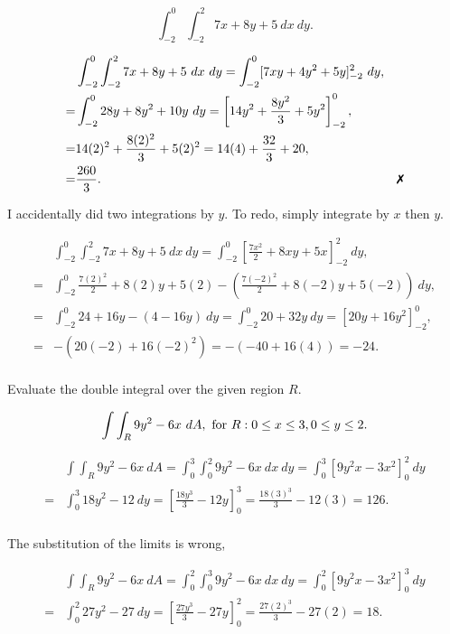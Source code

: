 \documentclass{article}
\begin{document}
            \[\int_{-2}^{0}\int_{-2}^{2} 7x + 8y + 5 ~ dx~ dy.\]

            \ans 

            \begin{align*}
                &\int_{-2}^{0}\int_{-2}^{2} 7x + 8y + 5 ~ dx~ dy = \int_{-2}^{0} [7xy + 4y^2 + 5y]_{-2}^{2} ~ dy,\\
                =&\int_{-2}^{0} 28y + 8y^2 + 10y ~ dy = \left[14y^2 + \frac{8y^2}{3} + 5y^2\right]_{-2}^{0},\\
                =&14(2)^2 + \frac{8(2)^2}{3} + 5(2)^2 = 14(4) + \frac{32}{3} + 20,\\
                =&\frac{260}{3}. &\xmark\\
            \end{align*}

            \rans I accidentally did two integrations by $y$. To redo, simply integrate by $x$ then $y$.
            
            \begin{align*}
                &\int_{-2}^{0}\int_{-2}^{2} 7x + 8y + 5 ~ dx~ dy = \int_{-2}^{0} \left[ \frac{7x^2}{2} + 8xy + 5x \right]_{-2}^{2} ~ dy,\\
                =&\int_{-2}^{0} \frac{7(2)^2}{2} + 8(2)y + 5(2) - \left( \frac{7(-2)^2}{2} + 8(-2)y + 5(-2) \right) ~ dy,\\
                =&\int_{-2}^{0} 24 + 16y - (4 - 16y) ~ dy = \int_{-2}^{0} 20 + 32y ~ dy = \left[ 20y + 16y^2 \right]_{-2}^{0},\\
                =&-(20(-2) + 16(-2)^2) = -(-40 + 16(4)) = -24.\\
            \end{align*}

        Evaluate the double integral over the given region $R$.

        \[\int\int_{R} 9y^2 -6x ~ dA, \text{ for } R: 0 \leq x \leq 3, 0 \leq y \leq 2.\]

        \ans 

        \begin{align*}
            &\int\int_{R} 9y^2 -6x ~ dA = \int_{0}^{3}\int_{0}^{2} 9y^2 -6x ~ dx ~ dy = \int_{0}^{3} \left[ 9y^2x - 3x^2 \right]_{0}^{2} ~ dy\\
            =&\int_{0}^{3} 18y^2 - 12 ~ dy = \left[ \frac{18y^3}{3} - 12y \right]_{0}^{3} = \frac{18(3)^3}{3} - 12(3) = 126.\\
        \end{align*}

        \rans The substitution of the limits is wrong,

        \begin{align*}
            &\int\int_{R} 9y^2 -6x ~ dA = \int_{0}^{2}\int_{0}^{3} 9y^2 -6x ~ dx ~ dy = \int_{0}^{2} \left[ 9y^2x - 3x^2 \right]_{0}^{3} ~ dy\\
            =&\int_{0}^{2} 27y^2 - 27 ~ dy = \left[ \frac{27y^3}{3} - 27y \right]_{0}^{2} = \frac{27(2)^3}{3} - 27(2) = 18.\\
        \end{align*}
\end{document}
